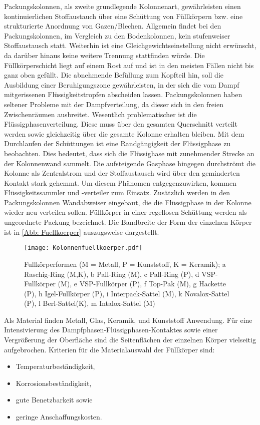 \documentclass[12pt,a4paper,bibtotocnumbered,liststotocnumbered]{scrreprt}
\begin{document}
Packungskolonnen, als zweite grundlegende Kolonnenart, gewährleisten einen kontinuierlichen Stoffaustauch über eine Schüttung von Füllkörpern bzw. eine strukturierte Anordnung von Gazen/Blechen. Allgemein findet bei den Packungskolonnen, im Vergleich zu den Bodenkolonnen, kein stufenweiser Stoffaustausch statt. Weiterhin ist eine Gleichgewichtseinstellung nicht erwünscht, da darüber hinaus keine weitere Trennung stattfinden würde. Die Füllkörperschicht liegt auf einem Rost auf und ist in den meisten Fällen nicht bis ganz oben gefüllt. Die abnehmende Befüllung zum Kopfteil hin, soll die Ausbildung einer Beruhigungszone gewährleisten, in der sich die vom Dampf mitgerissenen Flüssigkeitstropfen abscheiden lassen. Packungskolonnen haben seltener Probleme mit der Dampfverteilung, da dieser sich in den freien Zwischenräumen ausbreitet. Wesentlich problematischer ist die Flüssigphasenverteilung. Diese muss über den gesamten Querschnitt verteilt werden sowie gleichzeitig über die gesamte Kolonne erhalten bleiben. Mit dem Durchlaufen der Schüttungen ist eine Randgängigkeit der Flüssigphase zu beobachten. Dies bedeutet, dass sich die Flüssighase mit zunehmender Strecke an der Kolonnenwand sammelt. Die aufsteigende Gasphase hingegen durchströmt die Kolonne als Zentralstrom und der Stoffaustausch wird über den geminderten Kontakt stark gehemmt. Um diesem Phänomen entgegenzuwirken, kommen Flüssigkeitssammler und -verteiler zum Einsatz. Zusätzlich werden in den Packungskolonnen Wandabweiser eingebaut, die die Flüssigphase in der Kolonne wieder neu verteilen sollen. Füllkörper in einer regellosen Schüttung werden als ungeordnete Packung bezeichnet. Die Bandbreite der Form der einzelnen Körper ist in \autoref{Abb: Fuellkoerper} auszugsweise dargestellt.


\begin{figure}[H]
\begin{center}
\texttt{[image: Kolonnenfuellkoerper.pdf]}
\caption{Fullkörperformen (M = Metall, P = Kunststoff, K = Keramik); a Raschig-Ring (M,K), b Pall-Ring (M), c Pall-Ring (P), d VSP-Fullkörper (M), e VSP-Fullkörper (P), f Top-Pak (M), g Hackette (P), h Igel-Fullkörper (P), i Interpack-Sattel (M), k Novalox-Sattel (P), l Berl-Sattel(K), m Intalox-Sattel (M) \cite{Grassmann}}
\label{Abb: Fuellkoerper}
\end{center}
\end{figure}


Als Material finden Metall, Glas, Keramik, und Kunststoff Anwendung. Für eine Intensivierung des Dampfphasen-Flüssigphasen-Kontaktes sowie einer Vergrößerung der Oberfläche sind die Seitenflächen der einzelnen Körper vielseitig aufgebrochen. Kriterien für die Materialauswahl der Füllkörper sind:
\begin{itemize}
\item Temperaturbeständigkeit,
\item Korrosionsbeständigkeit,
\item gute Benetzbarkeit sowie
\item geringe Anschaffungskosten. 
\end{itemize}
\end{document}
